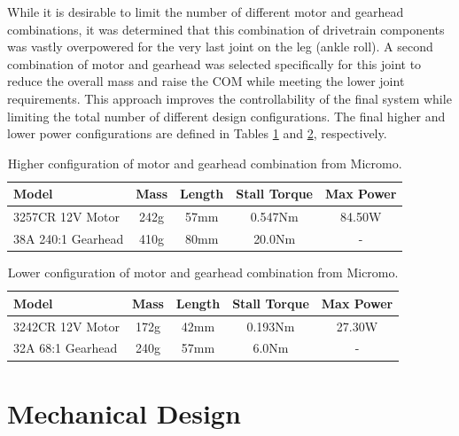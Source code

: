 While it is desirable to limit the number of different motor and gearhead combinations, it was determined that this combination of drivetrain components was vastly overpowered for the very last joint on the leg (ankle roll). A second combination of motor and gearhead was selected specifically for this joint to reduce the overall mass and raise the COM while meeting the lower joint requirements. This approach improves the controllability of the final system while limiting the total number of different design configurations. The final higher and lower power configurations are defined in Tables \ref{tab:higherconfig} and \ref{tab:lowerconfig}, respectively. 

\begin{table}[!h]
  \centering
  \caption{Higher configuration of motor and gearhead combination from Micromo.}
    \begin{tabular}{lcccc}
    \addlinespace
    \toprule
    \textbf{Model} & \textbf{Mass} & \textbf{Length} & \textbf{Stall Torque} & \textbf{Max Power}\\
    \midrule
    3257CR 12V Motor	&	242g	&	57mm	&	0.547Nm		&	84.50W	\\
    38A 240:1 Gearhead	&	410g	&	80mm	&	20.0Nm		&	-	\\
    \bottomrule
    \end{tabular}%
  \label{tab:higherconfig}%
\end{table}%

\begin{table}[!h]
  \centering
  \caption{Lower configuration of motor and gearhead combination from Micromo.}
    \begin{tabular}{lcccc}
    \addlinespace
    \toprule
    \textbf{Model} & \textbf{Mass} & \textbf{Length} & \textbf{Stall Torque} & \textbf{Max Power}\\
    \midrule
    3242CR 12V Motor	&	172g	&	42mm	&	0.193Nm		&	27.30W	\\
    32A 68:1 Gearhead	&	240g	&	57mm	&	6.0Nm		&	-	\\
    \bottomrule
    \end{tabular}%
  \label{tab:lowerconfig}%
\end{table}%

\section{Mechanical Design} %
\label{sec:chassis}

